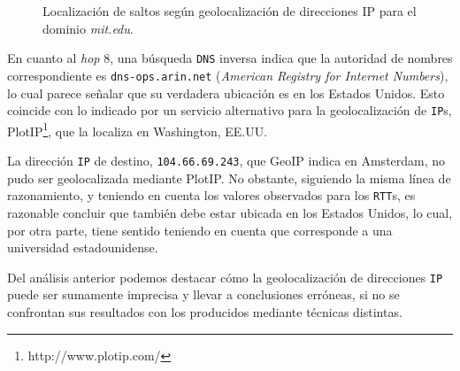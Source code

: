 \begin{figure}[H]
    \caption{Localización de saltos según geolocalización de direcciones IP para
    el dominio \emph{mit.edu}.}
    \label{res:escC:map}
\end{figure}

En cuanto al \emph{hop} 8, una búsqueda \texttt{DNS} inversa indica que la
autoridad de nombres correspondiente es \texttt{dns-ops.arin.net}
(\emph{American Registry for Internet Numbers}), lo cual parece señalar que
su verdadera ubicación es en los Estados Unidos. Esto coincide con lo indicado
por un servicio alternativo para la geolocalización de \texttt{IP}s,
PlotIP\footnote{http://www.plotip.com/}, que la localiza en Washington, EE.UU.

La dirección \texttt{IP} de destino, \texttt{104.66.69.243}, que GeoIP indica
en Amsterdam, no pudo ser geolocalizada mediante PlotIP. No obstante,
siguiendo la misma línea de razonamiento, y teniendo en cuenta los valores
observados para los \texttt{RTT}s, es razonable concluir que también debe
estar ubicada en los Estados Unidos, lo cual, por otra parte, tiene sentido
teniendo en cuenta que corresponde a una universidad estadounidense.

Del análisis anterior podemos destacar cómo la geolocalización de direcciones
\texttt{IP} puede ser sumamente imprecisa y llevar a conclusiones erróneas,
si no se confrontan sus resultados con los producidos mediante técnicas
distintas.
